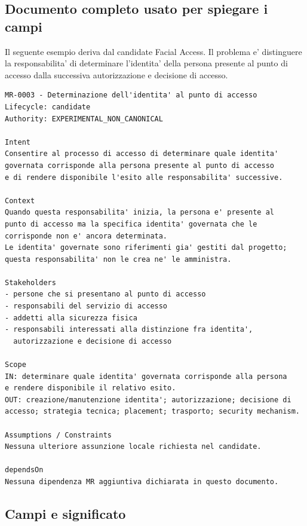 \documentclass[11pt,a4paper]{article}
\begin{document}
\subsection{Documento completo usato per spiegare i campi}

Il seguente esempio deriva dal candidate Facial Access. Il problema e' distinguere la responsabilita' di determinare l'identita' della persona presente al punto di accesso dalla successiva autorizzazione e decisione di accesso.

\begin{ddtaexample}[title={Facial Access - MR-0003 completo, forma L2 abbreviata solo nelle note amministrative}]
\begin{lstlisting}
MR-0003 - Determinazione dell'identita' al punto di accesso
Lifecycle: candidate
Authority: EXPERIMENTAL_NON_CANONICAL

Intent
Consentire al processo di accesso di determinare quale identita'
governata corrisponde alla persona presente al punto di accesso
e di rendere disponibile l'esito alle responsabilita' successive.

Context
Quando questa responsabilita' inizia, la persona e' presente al
punto di accesso ma la specifica identita' governata che le
corrisponde non e' ancora determinata.
Le identita' governate sono riferimenti gia' gestiti dal progetto;
questa responsabilita' non le crea ne' le amministra.

Stakeholders
- persone che si presentano al punto di accesso
- responsabili del servizio di accesso
- addetti alla sicurezza fisica
- responsabili interessati alla distinzione fra identita',
  autorizzazione e decisione di accesso

Scope
IN: determinare quale identita' governata corrisponde alla persona
e rendere disponibile il relativo esito.
OUT: creazione/manutenzione identita'; autorizzazione; decisione di
accesso; strategia tecnica; placement; trasporto; security mechanism.

Assumptions / Constraints
Nessuna ulteriore assunzione locale richiesta nel candidate.

dependsOn
Nessuna dipendenza MR aggiuntiva dichiarata in questo documento.
\end{lstlisting}
\end{ddtaexample}

\subsection{Campi e significato}
\end{document}
